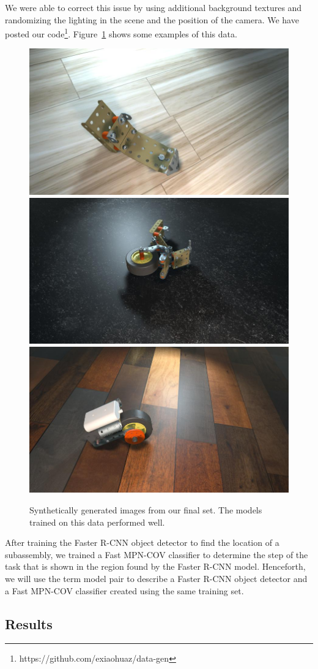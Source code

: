 We were able to correct this issue by using additional background textures and
randomizing the lighting in the scene and the position of the camera.
We have posted our code\footnote{https://github.com/exiaohuaz/data-gen}.
Figure~\ref{fig:good_data} shows some examples of this data.

\begin{figure}
  \includegraphics[width=0.5\columnwidth]{figures/synthetic/floor1.jpg}
  \includegraphics[width=0.5\columnwidth]{figures/synthetic/floor2.jpg}
  \includegraphics[width=0.5\columnwidth]{figures/synthetic/floor3.jpg}
  \caption{
    Synthetically generated images from our final set. The models trained on
    this data performed well.
  }\label{fig:good_data}
\end{figure}

After training the Faster R-CNN object detector to find the location of a
subassembly, we trained a Fast MPN-COV classifier to determine the step of the
task that is shown in the region found by the Faster R-CNN model.
Henceforth, we will use the term model pair to describe a Faster R-CNN object
detector and a Fast MPN-COV classifier created using the same training set.

\subsection{Results}

